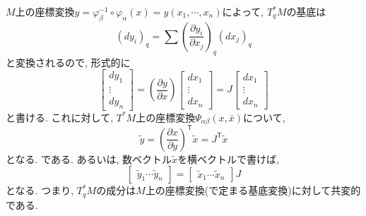 \documentclass[a4paper]{ujarticle}
\numberwithin{equation}{section}
\theoremstyle{definition}
\begin{document}
        $M$上の座標変換$y = \varphi_{\beta}^{-1} \circ \varphi_{\alpha}(x) = y(x_1, \cdots, x_n)$によって, 
        $T^{*}_q M$の基底は
        \[
            \left(d y_i\right)_q  = \sum \left(\frac{\partial y_i}{\partial x_j}\right)_q \left( d x_j\right)_q 
        \]
        と変換されるので, 形式的に
        \[
            \begin{bmatrix}
                d y_1 \\
                \vdots \\
                d y_n
            \end{bmatrix} = \left(\frac{\partial y}{\partial x}\right)
            \begin{bmatrix}
                d x_1 \\
                \vdots \\
                d x_n
            \end{bmatrix} =
            J
            \begin{bmatrix}
                d x_1 \\
                \vdots \\
                d x_n
            \end{bmatrix}
        \]
        と書ける.
        これに対して, $T^{*}M$上の座標変換$\Psi_{\alpha \beta}(x, \bar{x})$について, 
        \[
            \tilde{y} = \left(\frac{\partial x}{\partial y}\right)^{\mathsf{T}} \tilde{x} = J^{\mathsf{T}} \tilde{x}
        \]
        となる. 
        である.
        あるいは, 数ベクトル$\tilde{x}$を横ベクトルで書けば,
        \[
            \begin{bmatrix}
                \tilde{y}_1 \cdots \tilde{y}_n
            \end{bmatrix}
            =
            \begin{bmatrix}
                \tilde{x}_1 \cdots \tilde{x}_n
            \end{bmatrix}
            J
        \]
        となる. 
        つまり, $T^{*}_q M$の成分は$M$上の座標変換(で定まる基底変換)に対して共変的である.
\end{document}
